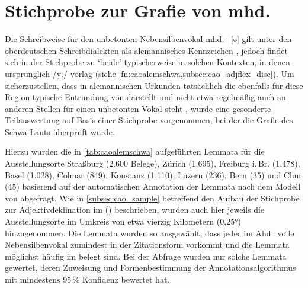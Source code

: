 
\chapter{Stichprobe zur Grafie von mhd.\ }
\label{sec:caoalemschwa}

Die Schreibweise  für den unbetonten Nebensilbenvokal mhd.~ [ə]
gilt unter den ober\-deutschen Schreibdialekten als alemannisches Kennzeichen
\autocites[vgl.][25]{weinhold1863}[75]{weinhold1883}[41, 113]{paul2007}, jedoch
findet sich  in der Stichprobe zu  `beide' typischerweise
in solchen Kontexten, in denen ursprünglich  /yː/ vorlag (siehe
\cref{fn:caoalemschwa,subsec:cao_adjflex_disc}). Um sicherzustellen, dass
 in alemannischen Urkunden tatsächlich die ebenfalls für diese Region
typische Entrundung von  darstellt und nicht etwa regelmäßig auch an
anderen Stellen für einen unbetonten Vokal steht
\autocites%
	[466--467]{schirmunski1962}%
	[41]{paul2007}%
	[305]{ksw2}%
	[vgl.~auch][131--132]{boesch1946}%
, wurde eine gesonderte Teilauswertung auf Basis einer Stichprobe vorgenommen,
bei der die Grafie des Schwa-Lauts überprüft wurde.

Hierzu wurden die in \cref{tab:caoalemschwa} aufgeführten Lemmata für die
Ausstellungsorte
Straßburg (2.600 Belege),
% 
Zürich (1.695),
% 
Freiburg i.\,Br. (1.478),
% 
Basel (1.028),
% 
Colmar (849),
% 
Konstanz (1.110),
% 
Luzern (236),
% 
Bern (35)
% 
und Chur (45)
% 
basierend auf der automatischen Annotation der Lemmata nach dem Modell von
\citet{schmid2019} abgefragt. Wie in \cref{subsec:cao_sample} betreffend den
Aufbau der Stichprobe zur Adjektivdeklination im  (\CAO) beschrieben, wurden auch hier jeweils die
Ausstellungsorte im Umkreis von etwa vierzig Kilometern (0,25°) hinzugenommen.
Die Lemmata wurden so ausgewählt, dass jeder im Ahd.\ volle Nebensilbenvokal
zumindest in der Zitationsform vorkommt und die Lemmata möglichst häufig im
\CAO{} belegt sind. Bei der Abfrage wurden nur solche Lemmata gewertet, deren
Zuweisung und Formenbestimmung der Annotations\-algorithmus mit mindestens
95\,\% Konfidenz bewertet hat.

